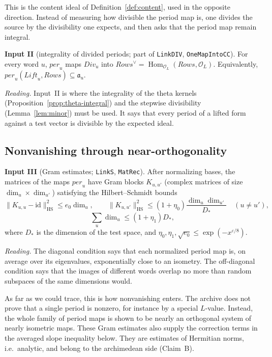 \documentclass[11pt]{amsart}
\theoremstyle{definition}
\theoremstyle{remark}
\newcommand{\per}{\mathit{per}}
\DeclareMathOperator{\Hom}{Hom}
\newcommand{\dual}{^{\vee}}
\begin{document}
This is the content ideal of Definition~\ref{def:content}, used in the opposite direction. Instead of measuring how divisible the period map is, one divides the source by the divisibility one expects, and then asks that the period map remain integral.

\noindent\textbf{Input II} (integrality of divided periods; part of \texttt{LinkDIV}, \texttt{OneMapIntoCC}). For every word $u$, $\per_u$ maps $\mathit{Div}_u$ into $\mathit{Rows}\dual=\Hom_{\mathcal O_L}(\mathit{Rows},\mathcal O_L)$. Equivalently, $\per_u(\mathit{Lift}_u,\mathit{Rows})\subseteq\mathfrak a_u$.

\noindent\emph{Reading.} Input~II is where the integrality of the theta kernels (Proposition~\ref{prop:theta-integral}) and the stepwise divisibility (Lemma~\ref{lem:minor}) must be used. It says that every period of a lifted form against a test vector is divisible by the expected ideal.

\subsection{Nonvanishing through near-orthogonality}
\noindent\textbf{Input III} (Gram estimates; \texttt{LinkS}, \texttt{MatRec}). After normalizing bases, the matrices of the maps $\per_u$ have Gram blocks $K_{u,u'}$ (complex matrices of size $\dim_u\times\dim_{u'}$) satisfying the Hilbert--Schmidt bounds
\[
\|K_{u,u}-\mathrm{id}\|_{\mathrm{HS}}^2\le e_0\dim_u,\qquad
\|K_{u,u'}\|_{\mathrm{HS}}^2\le(1+\eta_0)\frac{\dim_u\dim_{u'}}{D_*}\quad(u\neq u'),
\]
\[
\textstyle\sum_u\dim_u\le(1+\eta_1)D_*,
\]
where $D_*$ is the dimension of the test space, and $\eta_0,\eta_1,\sqrt{e_0}\le\exp(-x^{\varepsilon/8})$.

\noindent\emph{Reading.} The diagonal condition says that each normalized period map is, on average over its eigenvalues, exponentially close to an isometry. The off-diagonal condition says that the images of different words overlap no more than random subspaces of the same dimensions would.

As far as we could trace, this is how nonvanishing enters. The archive does not prove that a single period is nonzero, for instance by a special $L$-value. Instead, the whole family of period maps is shown to be nearly an orthogonal system of nearly isometric maps. These Gram estimates also supply the correction terms in the averaged slope inequality below. They are estimates of Hermitian norms, i.e.\ analytic, and belong to the archimedean side (Claim~B).
\end{document}
